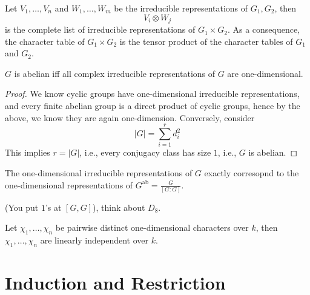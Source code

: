 \documentclass[openany]{book}
\begin{document}
\begin{prop}
    Let $V_1,\dots, V_n$ and $W_1,\dots, W_m$ be the irreducible representations of $G_1,G_2$, then 
    \begin{equation*}
        V_i\otimes W_j
    \end{equation*}
    is the complete list of irreducible representations of $G_1\times G_2$. As a consequence, the character table of $G_1\times G_2$ is the tensor product of the character tables of $G_1$ and $G_2$.
\end{prop}


\begin{prop}
    $G$ is abelian iff all complex irreducible representations of $G$ are one-dimensional.
\end{prop}
\begin{proof}
    We know cyclic groups have one-dimensional irreducible representations, and every finite abelian group is a direct product of cyclic groups, hence by the above, we know they are again one-dimension. Conversely, consider 
    \begin{equation*}
        |G|=\sum_{i=1}^rd_i^2
    \end{equation*}
    This implies $r=|G|$, i.e., every conjugacy class has size $1$, i.e., $G$ is abelian.
\end{proof}

\begin{prop}
    The one-dimensional irreducible representations of $G$ exactly corresopnd to the one-dimensional representations of $G^{\text{ab}}=\frac{G}{[G:G]}$. 
    
    (You put $1$'s at $[G,G]$), think about $D_8$.
\end{prop}


\begin{prop}
    Let $\chi_1,\dots, \chi_n$ be pairwise distinct one-dimensional characters over $k$, then $\chi_1,\dots, \chi_n$ are linearly independent over $k$.
\end{prop}







\section{Induction and Restriction}
\end{document}
